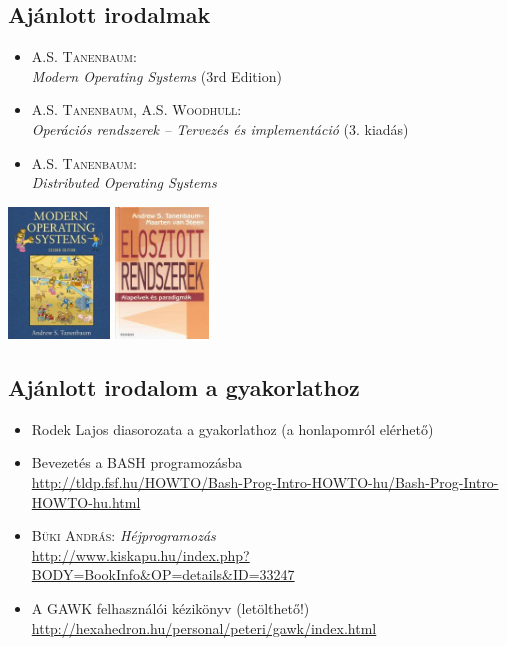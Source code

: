 \subsection*{Ajánlott irodalmak}
\begin{minipage}{0.66\textwidth}
\begin{itemize}
\item \textsc{A.S. Tanenbaum:}\\
	\textit{Modern Operating Systems} (3rd Edition)
\item \textsc{A.S. Tanenbaum, A.S. Woodhull:}\\
	\textit{Operációs rendszerek -- Tervezés és implementáció} (3. kiadás)
\item \textsc{A.S. Tanenbaum:}\\ \textit{Distributed Operating Systems}
\end{itemize}
\end{minipage}
\begin{minipage}{0.33\textwidth}
\begin{flushright}
\includegraphics[height=3.5cm]{pics/TanenbaumMOS}
\hspace{2mm}
\includegraphics[height=3.5cm]{pics/TanenbaumDOS}
\end{flushright}
\end{minipage}


\subsection*{Ajánlott irodalom a gyakorlathoz}
\begin{itemize}
\item Rodek Lajos diasorozata a gyakorlathoz (a honlapomról elérhető)
\item Bevezetés a BASH programozásba\\ \url{http://tldp.fsf.hu/HOWTO/Bash-Prog-Intro-HOWTO-hu/Bash-Prog-Intro-HOWTO-hu.html}
\item \textsc{Büki András:} \textit{Héjprogramozás}\\ \url{http://www.kiskapu.hu/index.php?BODY=BookInfo&OP=details&ID=33247}
\item A GAWK felhasználói kézikönyv (letölthető!)\\ \url{http://hexahedron.hu/personal/peteri/gawk/index.html}
\end{itemize}

